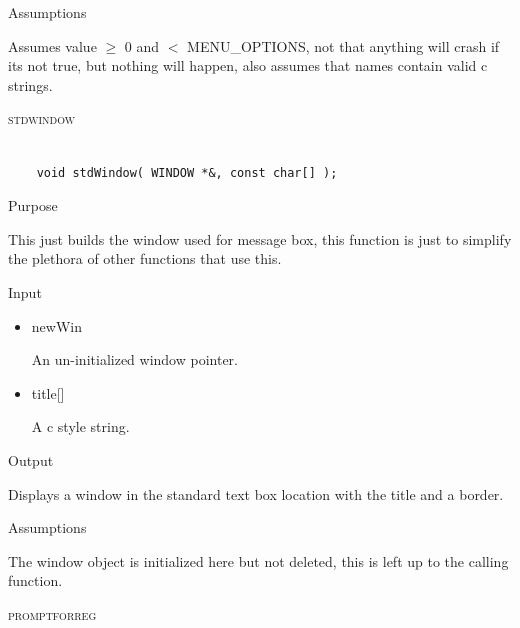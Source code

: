 \documentclass[pdftex, 11pt]{article}
\begin{document}
\begin{description}
\begin{description}
			\item{Assumptions}

				Assumes value $\geq$ 0 and $<$ MENU\_OPTIONS, not that anything
				will crash if its not true, but nothing will happen, also
				assumes that names contain valid c strings.

		\end{description}



	\item{\textsc{stdwindow}}

		\begin{lstlisting}

	void stdWindow( WINDOW *&, const char[] );
		\end{lstlisting}

		\begin{description}
			\item{Purpose}

				This just builds the window used for message box, this function is just to
				simplify the plethora of other functions that use this.
				
			\item{Input}
				
				\begin{itemize}

					\item{newWin}

						An un-initialized window pointer.

					\item{title[]}

						A c style string.

				\end{itemize}

			\item{Output}

				Displays a window in the standard text box location with
				the title and a border.

			\item{Assumptions}

				The window object is initialized here but not deleted, this
				is left up to the calling function.

		\end{description}



	\item{\textsc{promptforreg}}

		\begin{lstlisting}


\end{lstlisting}
\end{description}
\end{document}
